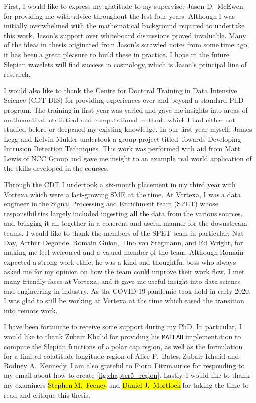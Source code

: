 \begin{acknowledgements}
	First, I would like to express my gratitude to my supervisor Jason D.~McEwen for providing me with advice throughout the last four years.
	Although I was initially overwhelmed with the mathematical background required to undertake this work, Jason's support over whiteboard discussions proved invaluable.
	Many of the ideas in thesis originated from Jason's scrawled notes from some time ago, it has been a great pleasure to build these in practice.
	I hope in the future Slepian wavelets will find success in cosmology, which is Jason's principal line of research.

	I would also like to thank the Centre for Doctoral Training in Data Intensive Science (CDT DIS) for providing experiences over and beyond a standard PhD program.
	The training in first year was varied and gave me insights into areas of mathematical, statistical and computational methods which I had either not studied before or deepened my existing knowledge.
	In our first year myself, James Legg and Kelvin Mulder undertook a group project titled Towards Developing Intrusion Detection Techniques.
	This work was performed with aid from Matt Lewis of NCC Group and gave me insight to an example real world application of the skills developed in the courses.

	Through the CDT I undertook a six-month placement in my third year with Vortexa which were a fast-growing SME at the time.
	At Vortexa, I was a data engineer in the Signal Processing and Enrichment team (SPET) whose responsibilities largely included ingesting all the data from the various sources, and bringing it all together in a coherent and useful manner for the downstream teams.
	I would like to thank the members of the SPET team in particular: Nat Day, Arthur Degonde, Romain Guion, Tino von Stegmann, and Ed Wright, for making me feel welcomed and a valued member of the team.
	Although Romain expected a strong work ethic, he was a kind and thoughtful boss who always asked me for my opinion on how the team could improve their work flow.
	I met many friendly faces at Vortexa, and it gave me useful insight into data science and engineering in industry.
	As the COVID-19 pandemic took hold in early 2020, I was glad to still be working at Vortexa at the time which eased the transition into remote work.

	I have been fortunate to receive some support during my PhD.
	In particular, I would like to thank Zubair Khalid for providing his \texttt{MATLAB} implementation to compute the Slepian functions of a polar cap region, as well as the formulation for a limited colatitude-longitude region of Alice P.~Bates, Zubair Khalid and Rodney A.~Kennedy.
	I am also grateful to Fionn Fitzmaurice for responding to my email about how to create \cref{fig:chapter5_region}.
	Lastly, I would like to thank my examiners \hl{Stephen M.~Feeney} and \hl{Daniel J.~Mortlock} for taking the time to read and critique this thesis.


\end{acknowledgements}
